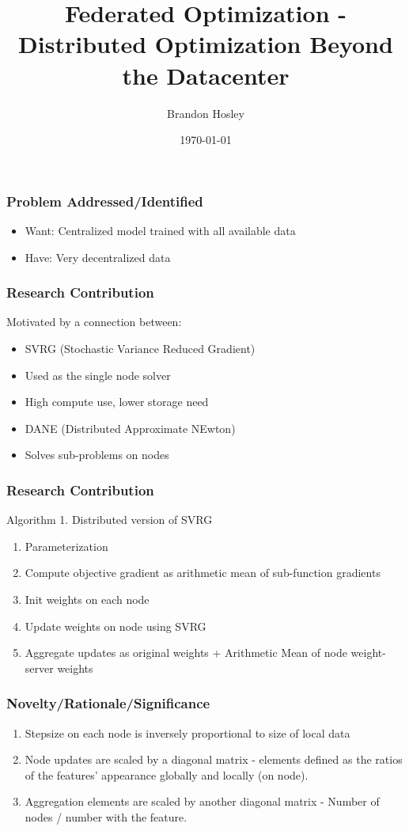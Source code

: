 \documentclass{beamer}
\title{Federated Optimization - Distributed Optimization Beyond the Datacenter}
\subtitle{}
\author{Brandon Hosley}
\institute{}
\date{\today}
\begin{document}
\begin{frame}
	\titlepage
\end{frame}



\begin{frame}
	\frametitle{Problem Addressed/Identified}
	\begin{itemize}
		\item Want: Centralized model trained with all available data
		\item Have: Very decentralized data
	\end{itemize}
\end{frame}

\begin{frame}
	\frametitle{Research Contribution}
	Motivated by a connection between:
	\begin{itemize}
		\item SVRG (Stochastic Variance Reduced Gradient)
		\item Used as the single node solver
		\item High compute use, lower storage need
		\item DANE (Distributed Approximate NEwton)
		\item Solves sub-problems on nodes
	\end{itemize}
\end{frame}

\begin{frame}
	\frametitle{Research Contribution}
	Algorithm 1. Distributed version of SVRG
	\begin{enumerate}
		\item Parameterization
		\item Compute objective gradient as arithmetic mean of sub-function gradients
		\item Init weights on each node
		\item Update weights on node using SVRG
		\item Aggregate updates as original weights + Arithmetic Mean of node weight-server weights
	\end{enumerate}
\end{frame}

\begin{frame}
	\frametitle{Novelty/Rationale/Significance}
	\begin{enumerate}
		\item Stepsize on each node is inversely proportional to size of local data
		\item Node updates are scaled by a diagonal matrix - elements defined as the ratios of the features' appearance globally and locally (on node).
		\item Aggregation elements are scaled by another diagonal matrix - Number of nodes / number with the feature.
	\end{enumerate}
\end{frame}
\end{document}
